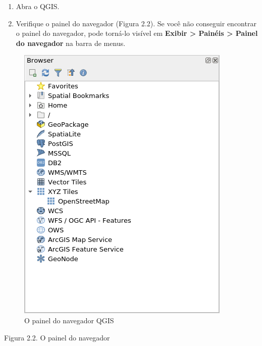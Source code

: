 \documentclass[
  portuguese,
]{krantz}
\providecommand{\tightlist}{%
  \setlength{\itemsep}{0pt}\setlength{\parskip}{0pt}}
\begin{document}
\begin{enumerate}
\def\labelenumi{\arabic{enumi}.}
\tightlist
\item
  Abra o QGIS.
\item
  Verifique o painel do navegador (Figura 2.2). Se você não conseguir encontrar o painel do navegador, pode torná-lo visível em \textbf{Exibir \textgreater{} Painéis \textgreater{} Painel do navegador} na barra de menus.
\end{enumerate}

\begin{figure}
\centering
\includegraphics{media/modulo2/qgis-browser-1.png}
\caption{O painel do navegador QGIS}
\end{figure}

Figura 2.2. O painel do navegador
\end{document}
